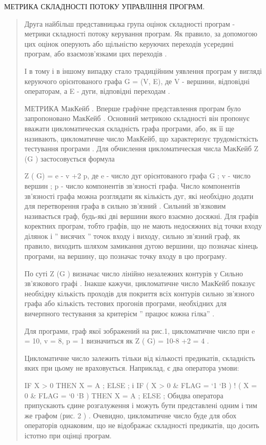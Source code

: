 МЕТРИКА СКЛАДНОСТІ ПОТОКУ УПРАВЛІННЯ ПРОГРАМ.
\begin{quote}

Друга найбільш представницька група оцінок складності програм - метрики складності потоку керування програм. Як правило, за допомогою цих оцінок оперують або щільністю керуючих переходів усередині програм, або взаємозв'язками цих переходів .

І в тому і в іншому випадку стало традиційним уявлення програм у вигляді керуючого орієнтованого графа G = (V, E), де V - вершини, відповідні операторам, а E - дуги, відповідні переходам .

МЕТРИКА МакКейб .
Вперше графічне представлення програм було запропоновано МакКейб . Основний метрикою складності він пропонує вважати цикломатическая складність графа програми, або, як її ще називають, цикломатичне число МакКейб, що характеризує трудомісткість тестування програми .
Для обчислення цикломатическая числа МакКейб Z (G ) застосовується формула

Z ( G) = e - v +2 p,
де e - число дуг орієнтованого графа G ;
v - число вершин ;
p - число компонентів зв'язності графа.
Число компонентів зв'язності графа можна розглядати як кількість дуг, які необхідно додати для перетворення графа в сильно зв'язний . Сильний зв'язковим називається граф, будь-які дві вершини якого взаємно досяжні. Для графів коректних програм, тобто графів, що не мають недосяжних від точки входу ділянок і '' висячих '' точок входу і виходу, сильно зв'язний граф, як правило, виходить шляхом замикання дугою вершини, що позначає кінець програми, на вершину, що позначає точку входу в цю програму.

По суті Z (G ) визначає число лінійно незалежних контурів у Сильно зв'язкового графі . Інакше кажучи, цикломатичне число МакКейб показує необхідну кількість проходів для покриття всіх контурів сильно зв'язного графа або кількість тестових прогонів програми, необхідних для вичерпного тестування за критерієм '' працює кожна гілка'' .

Для програми, граф якої зображений на рис.1, цикломатичне число при e = 10, v = 8, p = 1 визначиться як Z ( G) = 10-8 +2 = 4 .

Цикломатичне число залежить тільки від кількості предикатів, складність яких при цьому не враховується. Наприклад, є два оператора умови:

IF X \textgreater{} 0
THEN X = A ;
ELSE ;
і
IF ( X \textgreater{} 0 \& FLAG = `1 `B ) !
( X = 0 \& FLAG = `0 `B )
THEN X = A ;
ELSE ;
Обидва оператора припускають єдине розгалуження і можуть бути представлені одним і тим же графом (рис. 2 ) . Очевидно, цикломатичне число буде для обох операторів однаковим, що не відображає складності предикатів, що досить істотно при оцінці програм.
\end{quote}
